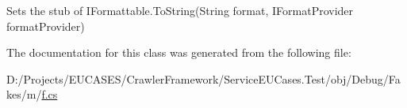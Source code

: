 Sets the stub of I\-Formattable.\-To\-String(\-String format, I\-Format\-Provider format\-Provider)



The documentation for this class was generated from the following file\-:\begin{DoxyCompactItemize}
\item 
D\-:/\-Projects/\-E\-U\-C\-A\-S\-E\-S/\-Crawler\-Framework/\-Service\-E\-U\-Cases.\-Test/obj/\-Debug/\-Fakes/m/\hyperlink{m_2f_8cs}{f.\-cs}\end{DoxyCompactItemize}
